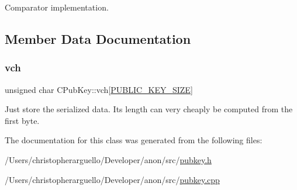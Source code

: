 Comparator implementation. 



\subsection{Member Data Documentation}
\mbox{\label{class_c_pub_key_a9a55b20ad79b45f3430b4e316a2c48d4}} 
\subsubsection{\texorpdfstring{vch}{vch}}
{\footnotesize\ttfamily unsigned char C\+Pub\+Key\+::vch\mbox{[}\mbox{\hyperlink{pubkey_8h_ab921d367fa7639df1a3bc22f8acbe9f4}{P\+U\+B\+L\+I\+C\+\_\+\+K\+E\+Y\+\_\+\+S\+I\+ZE}}\mbox{]}\hspace{0.3cm}{\ttfamily [private]}}

Just store the serialized data. Its length can very cheaply be computed from the first byte. 

The documentation for this class was generated from the following files\+:\begin{DoxyCompactItemize}
\item 
/\+Users/christopherarguello/\+Developer/anon/src/\mbox{\hyperlink{pubkey_8h}{pubkey.\+h}}\item 
/\+Users/christopherarguello/\+Developer/anon/src/\mbox{\hyperlink{pubkey_8cpp}{pubkey.\+cpp}}\end{DoxyCompactItemize}
